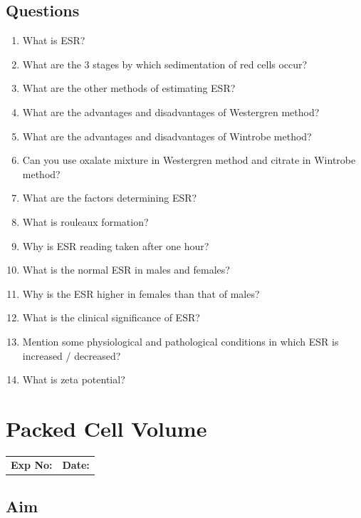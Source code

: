 \documentclass[a4paper,12pt,openany,oneside]{book}
\begin{document}
												\section*{Questions}
												\begin{enumerate}
													\item{What is ESR?}
													\item{What are the 3 stages by which sedimentation of red cells occur?}
													\item{What are the other methods of estimating ESR?}
													\item{What are the advantages and disadvantages of Westergren method?}
													\item{What are the advantages and disadvantages of Wintrobe method?}
													\item{Can you use oxalate mixture in Westergren method and citrate in Wintrobe method?}
													\item{What are the factors determining ESR?}
													\item{What is rouleaux formation?}
													\item{Why is ESR reading taken after one hour?}
													\item{What is the normal ESR in males and females?}
													\item{Why is the ESR higher in females than that of males?}
													\item{What is the clinical significance of ESR?}
													\item{Mention some physiological and pathological conditions in which ESR is increased / decreased?}
													\item{What is zeta potential?}
												\end{enumerate}

												\chapter*{\centering Packed Cell Volume}
												\begin{tabular}{p{5in} p{1in}}
													\textbf{Exp No:}  & \textbf{Date:}\\
												\end{tabular}

												\section*{Aim}
\end{document}
